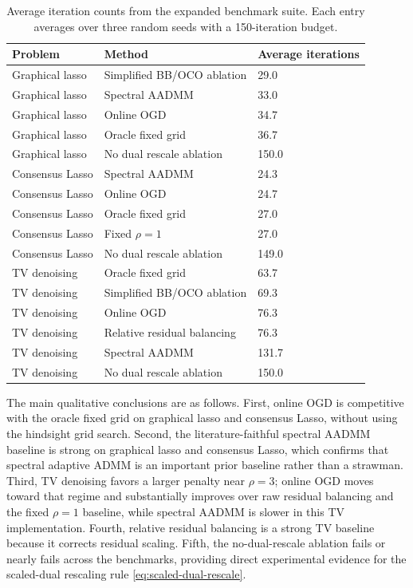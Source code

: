 \documentclass[11pt]{article}
\begin{document}
\begin{table}[t]
\centering
\begin{tabular}{lll}
\toprule
Problem & Method & Average iterations \\
\midrule
Graphical lasso & Simplified BB/OCO ablation & 29.0 \\
Graphical lasso & Spectral AADMM & 33.0 \\
Graphical lasso & Online OGD & 34.7 \\
Graphical lasso & Oracle fixed grid & 36.7 \\
Graphical lasso & No dual rescale ablation & 150.0 \\
\midrule
Consensus Lasso & Spectral AADMM & 24.3 \\
Consensus Lasso & Online OGD & 24.7 \\
Consensus Lasso & Oracle fixed grid & 27.0 \\
Consensus Lasso & Fixed $\rho=1$ & 27.0 \\
Consensus Lasso & No dual rescale ablation & 149.0 \\
\midrule
TV denoising & Oracle fixed grid & 63.7 \\
TV denoising & Simplified BB/OCO ablation & 69.3 \\
TV denoising & Online OGD & 76.3 \\
TV denoising & Relative residual balancing & 76.3 \\
TV denoising & Spectral AADMM & 131.7 \\
TV denoising & No dual rescale ablation & 150.0 \\
\bottomrule
\end{tabular}
\caption{Average iteration counts from the expanded benchmark suite.  Each
entry averages over three random seeds with a 150-iteration budget.}
\label{tab:benchmark-iterations}
\end{table}

The main qualitative conclusions are as follows.  First, online OGD is
competitive with the oracle fixed grid on graphical lasso and consensus Lasso,
without using the hindsight grid search.  Second, the literature-faithful
spectral AADMM baseline is strong on graphical lasso and consensus Lasso, which
confirms that spectral adaptive ADMM is an important prior baseline rather than
a strawman.  Third, TV denoising favors a larger penalty near $\rho=3$; online
OGD moves toward that regime and substantially improves over raw residual
balancing and the fixed $\rho=1$ baseline, while spectral AADMM is slower in
this TV implementation.  Fourth, relative residual balancing is a strong TV
baseline because it corrects residual scaling.  Fifth, the no-dual-rescale
ablation fails or nearly fails across the benchmarks, providing direct
experimental evidence for the scaled-dual rescaling rule
\eqref{eq:scaled-dual-rescale}.
\end{document}
